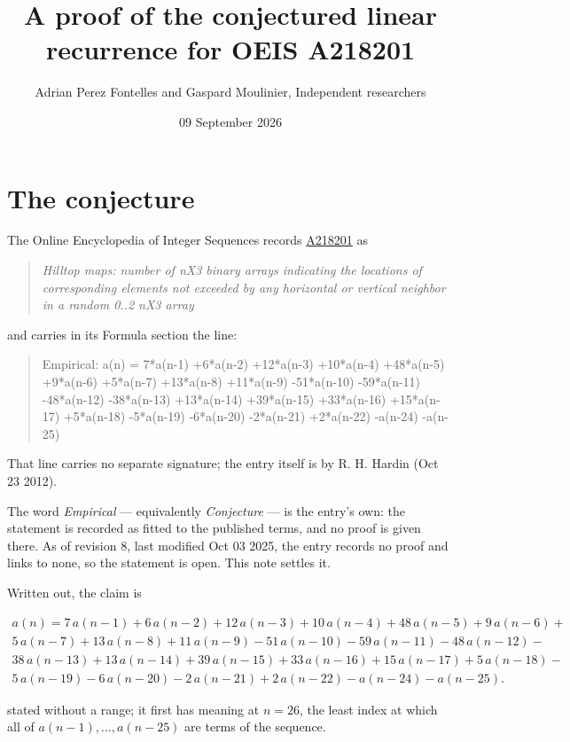 \documentclass[11pt]{article}
\title{A proof of the conjectured linear recurrence for OEIS A218201}
\author{Adrian Perez Fontelles and Gaspard Moulinier, Independent researchers}
\date{09 September 2026}
\theoremstyle{definition}
\begin{document}
\maketitle
\section{The conjecture}

The Online Encyclopedia of Integer Sequences records \href{https://oeis.org/A218201}{A218201} as

\begin{quote}\itshape Hilltop maps: number of nX3 binary arrays indicating the locations of corresponding elements not exceeded by any horizontal or vertical neighbor in a random 0..2 nX3 array\end{quote}

and carries in its Formula section the line:

\begin{quote}\ttfamily Empirical: a(n) = 7*a(n-1) +6*a(n-2) +12*a(n-3) +10*a(n-4) +48*a(n-5) +9*a(n-6) +5*a(n-7) +13*a(n-8) +11*a(n-9) -51*a(n-10) -59*a(n-11) -48*a(n-12) -38*a(n-13) +13*a(n-14) +39*a(n-15) +33*a(n-16) +15*a(n-17) +5*a(n-18) -5*a(n-19) -6*a(n-20) -2*a(n-21) +2*a(n-22) -a(n-24) -a(n-25)\end{quote}

That line carries no separate signature; the entry itself is by R. H. Hardin (Oct 23 2012).

The word {\itshape Empirical} --- equivalently {\itshape Conjecture} --- is the entry's own: the statement is recorded as fitted to the published terms, and no proof is given there. As of revision 8, last modified Oct 03 2025, the entry records no proof and links to none, so the statement is open. This note settles it.

Written out, the claim is

\begin{multline*} a(n) = 7\,a(n-1) + 6\,a(n-2) + 12\,a(n-3) + 10\,a(n-4) + 48\,a(n-5) + 9\,a(n-6) + \\ 5\,a(n-7) + 13\,a(n-8) + 11\,a(n-9) - 51\,a(n-10) - 59\,a(n-11) - 48\,a(n-12) - \\ 38\,a(n-13) + 13\,a(n-14) + 39\,a(n-15) + 33\,a(n-16) + 15\,a(n-17) + 5\,a(n-18) - \\ 5\,a(n-19) - 6\,a(n-20) - 2\,a(n-21) + 2\,a(n-22) - a(n-24) - a(n-25). \end{multline*}

stated without a range; it first has meaning at $n = 26$, the least index at which all of $a(n-1),\dots,a(n-25)$ are terms of the sequence.
\end{document}
